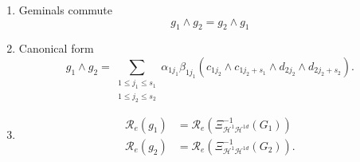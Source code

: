 \documentclass[aps,preprint]{revtex4}%
\newtheorem{example}[theorem]{Example}
\begin{document}
\begin{enumerate}
\begin{example}
\begin{enumerate}
\item
\begin{align}
\mathcal{R}_{e}\left(  G_{1}\oplus G_{2}\right)   &  =\left(
\begin{array}
[c]{cc}%
\mathbb{G}_{1} & \mathbb{O}\\
\mathbb{O} & \mathbb{G}_{2}%
\end{array}
\right) \\
\mathcal{R}_{e}\left(  G_{2}\oplus G_{1}\right)   &  =\left(
\begin{array}
[c]{cc}%
\mathbb{G}_{2} & \mathbb{O}\\
\mathbb{O} & \mathbb{G}_{1}%
\end{array}
\right)  .
\end{align}


\item
\begin{equation}
\mathcal{R}_{e}\left(  G_{1}\otimes G_{2}\right)  \in\mathcal{B}\left(
\mathbb{C}^{6}\otimes\mathbb{C}^{6}\right)  .
\end{equation}


\item
\begin{equation}
\mathcal{B}\left(  \mathbb{C}^{6}\otimes\mathbb{C}^{6}\right)  \supset
\mathcal{B}\left(  \mathbb{C}^{6}\wedge\mathbb{C}^{6}\right)  \equiv
\mathcal{B}\left(  \bigwedge\nolimits^{2}\mathbb{C}^{6}\right)  .
\end{equation}


\item
\begin{equation}
\mathcal{R}_{e}\left(  g\right)  \in\bigwedge\nolimits^{2}\mathbb{C}^{6}.
\end{equation}

\end{enumerate}
\end{example}

\item Geminals commute%
\begin{equation}
g_{1}\wedge g_{2}=g_{2}\wedge g_{1}%
\end{equation}


\item Canonical form%
\begin{equation}
g_{1}\wedge g_{2}=\sum_{\substack{1\leq j_{1}\leq s_{1}\\1\leq j_{2}\leq
s_{2}}}\alpha_{1j_{1}}\beta_{1j_{1}}\left(  c_{1j_{2}}\wedge c_{1j_{2}+s_{1}%
}\wedge d_{2j_{2}}\wedge d_{2j_{2}+s_{2}}\right)  .
\end{equation}


\item
\begin{align}
\mathcal{R}_{e}\left(  g_{1}\right)   &  =\mathcal{R}_{e}\left(
\Xi_{\mathcal{H}^{1}\mathcal{H}^{1d}}^{-1}\left(  G_{1}\right)  \right) \\
\mathcal{R}_{e}\left(  g_{2}\right)   &  =\mathcal{R}_{e}\left(
\Xi_{\mathcal{H}^{1}\mathcal{H}^{1d}}^{-1}\left(  G_{2}\right)  \right)  .
\end{align}

\end{enumerate}
\end{document}
